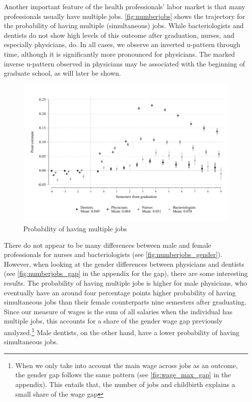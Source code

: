 \documentclass[12pt, a4paper]{article}
\begin{document}
Another important feature of the health professionals' labor market is that many professionals usually have multiple jobs. \autoref{fig:numberjobs} shows the trajectory for the probability of having multiple (simultaneous) jobs. While bacteriologists and dentists do not show high levels of this outcome after graduation, nurses, and especially physicians, do. In all cases, we observe an inverted u-pattern through time, although it is significantly more pronounced for physicians. The marked inverse u-pattern observed in physicians may be associated with the beginning of graduate school, as will later be shown. 

\begin{figure}[H]
\caption{Probability of having multiple jobs}\label{fig:numberjobs}
\centering 
\includegraphics[width=\textwidth]{Figures/Callaway SantAnna/ES_p_cotizaciones_0_all.pdf}
\end{figure}

There do not appear to be many differences between male and female professionals for nurses and bacteriologists (see \autoref{fig:numberjobs_gender}). However, when looking at the gender differences between physicians and dentists (see \autoref{fig:numberjobs_gap} in the appendix for the gap), there are some interesting results. The probability of having multiple jobs is higher for male physicians, who eventually have an around four percentage points higher probability of having simultaneous jobs than their female counterparts nine semesters after graduating. Since our measure of wages is the sum of all salaries when the individual has multiple jobs, this accounts for a share of the gender wage gap previously analyzed.\footnote{When we only take into account the main wage across jobs as an outcome, the gender gap follows the same pattern (see \autoref{fig:wage_max_gap} in the appendix). This entails that, the number of jobs and childbirth explains a small share of the wage gap} Male dentists, on the other hand, have a lower probability of having simultaneous jobs.
\end{document}
